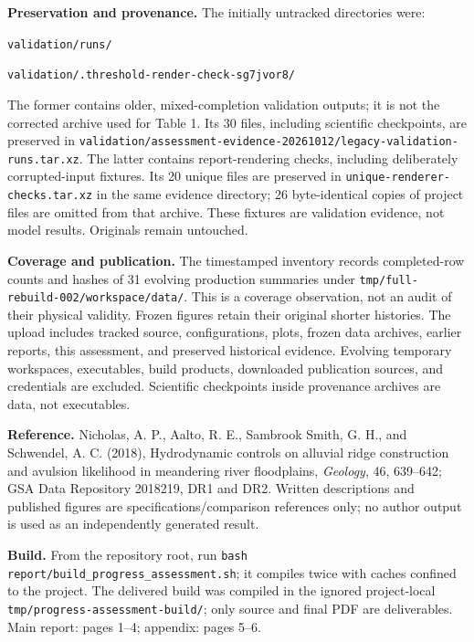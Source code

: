 \documentclass[10pt,letterpaper]{article}
\newcommand{\file}[1]{\nolinkurl{#1}}
\begin{document}
\textbf{Preservation and provenance.} The initially untracked directories were:\par\file{validation/runs/}\par\file{validation/.threshold-render-check-sg7jvor8/}\par The former contains older, mixed-completion validation outputs; it is not the corrected archive used for Table 1. Its 30 files, including scientific checkpoints, are preserved in \file{validation/assessment-evidence-20261012/legacy-validation-runs.tar.xz}. The latter contains report-rendering checks, including deliberately corrupted-input fixtures. Its 20 unique files are preserved in \file{unique-renderer-checks.tar.xz} in the same evidence directory; 26 byte-identical copies of project files are omitted from that archive. These fixtures are validation evidence, not model results. Originals remain untouched.

\textbf{Coverage and publication.} The timestamped inventory records completed-row counts and hashes of 31 evolving production summaries under \file{tmp/full-rebuild-002/workspace/data/}. This is a coverage observation, not an audit of their physical validity. Frozen figures retain their original shorter histories. The upload includes tracked source, configurations, plots, frozen data archives, earlier reports, this assessment, and preserved historical evidence. Evolving temporary workspaces, executables, build products, downloaded publication sources, and credentials are excluded. Scientific checkpoints inside provenance archives are data, not executables.

\textbf{Reference.} Nicholas, A. P., Aalto, R. E., Sambrook Smith, G. H., and Schwendel, A. C. (2018), Hydrodynamic controls on alluvial ridge construction and avulsion likelihood in meandering river floodplains, \emph{Geology}, 46, 639--642; GSA Data Repository 2018219, DR1 and DR2. Written descriptions and published figures are specifications/comparison references only; no author output is used as an independently generated result.

\textbf{Build.} From the repository root, run \texttt{bash} \file{report/build_progress_assessment.sh}; it compiles twice with caches confined to the project. The delivered build was compiled in the ignored project-local \file{tmp/progress-assessment-build/}; only source and final PDF are deliverables. Main report: pages 1--4; appendix: pages 5--6.
\end{document}
